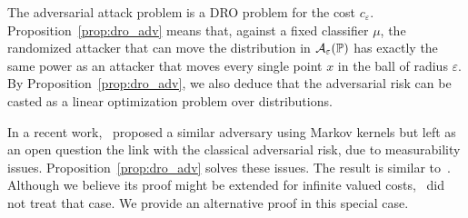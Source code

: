 The adversarial attack problem is a DRO problem for the cost $c_\varepsilon$.
Proposition~\ref{prop:dro_adv} means that, against a fixed classifier $\mu$, the randomized attacker that can move the distribution in $\mathcal{A}_\varepsilon(\mathbb{P})$ has exactly the same power as an attacker that moves every single point $x$ in the ball of radius $\varepsilon$.  By Proposition~\ref{prop:dro_adv}, we also  deduce that the adversarial risk can be casted as a linear optimization problem over distributions.

\begin{rmq}
  In a recent work,~\citep{pydi2019adversarial} proposed a similar adversary using Markov kernels but left as an open question the link with the classical adversarial risk, due to measurability issues. Proposition~\ref{prop:dro_adv} solves these issues. The result is similar to~\citep{blanchet2019quantifying}. Although we believe its proof might be extended for infinite valued costs,~\citep{blanchet2019quantifying} did not treat that case. We provide an alternative proof in this special case. 
\end{rmq}



